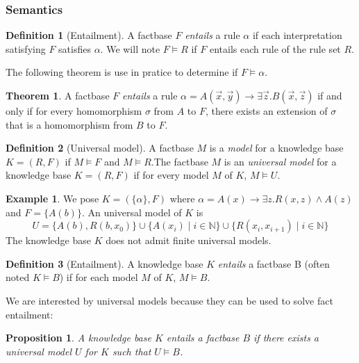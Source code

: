 \documentclass{article}
\newtheorem{proposition}{Proposition}[section]
\theoremstyle{definition}
\newtheorem{definition}{Definition}[section]
\newtheorem{theorem}{Theorem}[section]
\newtheorem{example}{Example}[section]
\theoremstyle{remark}
\def \N {\mathbb N}
\begin{document}
\subsubsection{Semantics}

\begin{definition}[Entailment]
A factbase $F$ \emph{entails} a rule $\alpha$ if each interpretation satisfying $F$ satisfies $\alpha$. We will note $F \models R$ if $F$ entails each rule of the rule set $R$.
\end{definition}

The following theorem is use in pratice to determine if $F \models \alpha$.

\begin{theorem}
A factbase $F$ \emph{entails} a rule $\alpha = A(\vec x,\vec y) \rightarrow \exists \vec z. B(\vec x,\vec z)$ if and only if for every homomorphism $\sigma$ from $A$ to $F$, there exists an extension of $\sigma$ that is a homomorphism from $B$ to $F$.
\end{theorem}



\begin{definition}[Universal model]
A factbase $M$ is a \emph{model} for a knowledge base $K = (R,F)$ if $M \models F$ and $M \models R$.The factbase $M$ is an \emph{universal model} for a knowledge base $K = (R,F)$ if for
every model $M$ of $K$, $M \models U$.
\end{definition}

\begin{example} We pose $K = (\{\alpha\},F)$ where $\alpha = A(x) \rightarrow \exists z.R(x,z) \wedge A(z)$ and $F = \{A(b)\}$. An universal model of $K$ is $$U = \{A(b),R(b,x_0)\}\cup \{A(x_i)\mid i \in \N\}\cup \{R(x_i,x_{i+1}) \mid i \in \N\}$$ The knowledge base $K$ does not admit finite universal models.
\end{example}

\begin{definition}[Entailment]
A knowledge base $K$ \emph{entails} a factbase B (often noted $K \models B$) if for each model $M$ of $K$, $M \models B$.
\end{definition}




We are interested by universal models because  they can be used to solve fact entailment:

\begin{proposition}
A knowledge base $K$ entails a factbase $B$ if there exists a universal model $U$ for $K$ such that $U \models B$.
\end{proposition}
\end{document}
